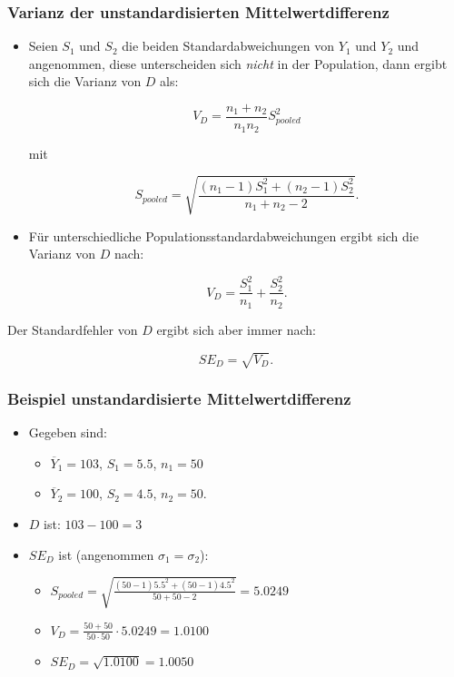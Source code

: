\begin{frame}\frametitle{Varianz der unstandardisierten
    Mittelwertdifferenz}\label{sec:effektstarken-der-d}

  \begin{itemize}
  \item Seien $S_1$ und $S_2$ die beiden Standardabweichungen von $Y_1$ und
    $Y_2$ und angenommen, diese unterscheiden sich \emph{nicht} in der
    Population, dann ergibt sich die Varianz von $D$ als:
    
    \begin{equation}
      V_D = \frac{n_1 + n_2}{n_1n_2}S^2_{pooled} 
    \end{equation}
    
    mit
    
    \begin{equation}\label{eq:sd_pooled}
      S_{pooled} = \sqrt{\frac{(n_1-1)S^2_1 + (n_2-1)S^2_2}{n_1+n_2-2}}.
    \end{equation}
    
  \item Für unterschiedliche Populationsstandardabweichungen ergibt sich die Varianz
    von $D$ nach:
    
    \begin{equation}
      V_D = \frac{S^2_1}{n_1} + \frac{S^2_2}{n_2}.
    \end{equation}
  \end{itemize}
  
  Der Standardfehler von $D$ ergibt sich aber immer nach: 

  \begin{equation}
    SE_D = \sqrt{V_D}.
  \end{equation}
\end{frame}


\begin{frame}\frametitle{Beispiel unstandardisierte Mittelwertdifferenz}
  \begin{itemize}
  \item Gegeben sind:
    \begin{itemize}
    \item $\overline{Y}_1=103$, $S_1=5.5$, $n_1=50$
    \item $\overline{Y}_2=100$, $S_2=4.5$, $n_2=50$.
  \end{itemize}
  \item $D$ ist: $103-100=3$
  \item $SE_D$ ist (angenommen $\sigma_1 = \sigma_2$):
    \begin{itemize}
    \item $S_{pooled}=\sqrt{\frac{(50-1)5.5^2 + (50-1)4.5^2}{50+50-2}}=5.0249$
    \item $V_D = \frac{50+50}{50 \cdot 50} \cdot 5.0249 = 1.0100$
    \item $SE_D= \sqrt{1.0100} = 1.0050$
  \end{itemize}
  \end{itemize}
  \vfill
  \citep[22]{borenstein_introduction_2009}
\end{frame}



